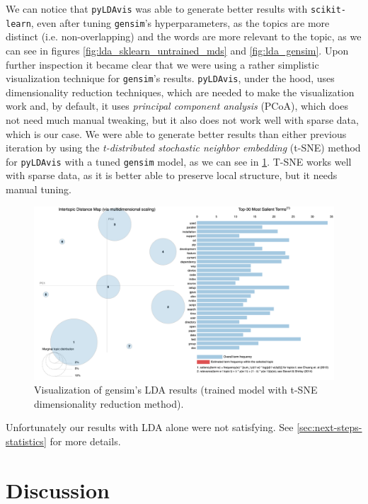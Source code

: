 \documentclass[conference, onecolumn]{IEEEtran}
\begin{document}
We can notice that \verb|pyLDAvis| was able to generate better results with
\verb|scikit-learn|, even after tuning \verb|gensim|'s hyperparameters, as the
topics are more distinct (i.e. non-overlapping) and the words are more relevant
to the topic, as we can see in figures \cref{fig:lda_sklearn_untrained_mds} and
\cref{fig:lda_gensim}.
Upon further inspection it became clear that we were using a rather simplistic
visualization technique for \verb|gensim|'s results.
\verb|pyLDAvis|, under the hood, uses dimensionality reduction techniques,
which are needed to make the visualization work and, by default, it uses
\textit{principal component analysis} (PCoA), which does not need much manual
tweaking, but it also does not work well with sparse data, which is our case.
We were able to generate better results than either previous iteration by using
the \textit{t-distributed stochastic neighbor embedding} (t-SNE) method for
\verb|pyLDAvis| with a tuned \verb|gensim| model, as we can see in
\cref{fig:lda_gensim_tsne}.
T-SNE works well with sparse data, as it is better able to preserve local
structure, but it needs manual tuning.

\begin{figure}[H]
    \centering
    \includegraphics[width=\linewidth]{gensim-tsne.png}
    \caption{Visualization of gensim's LDA results (trained model with t-SNE
        dimensionality reduction method).}
    \label{fig:lda_gensim_tsne}
\end{figure}

Unfortunately our results with LDA alone were not satisfying.
See \cref{sec:next-steps-statistics} for more details.

\section{Discussion} \label{sec:discussion}
\end{document}

